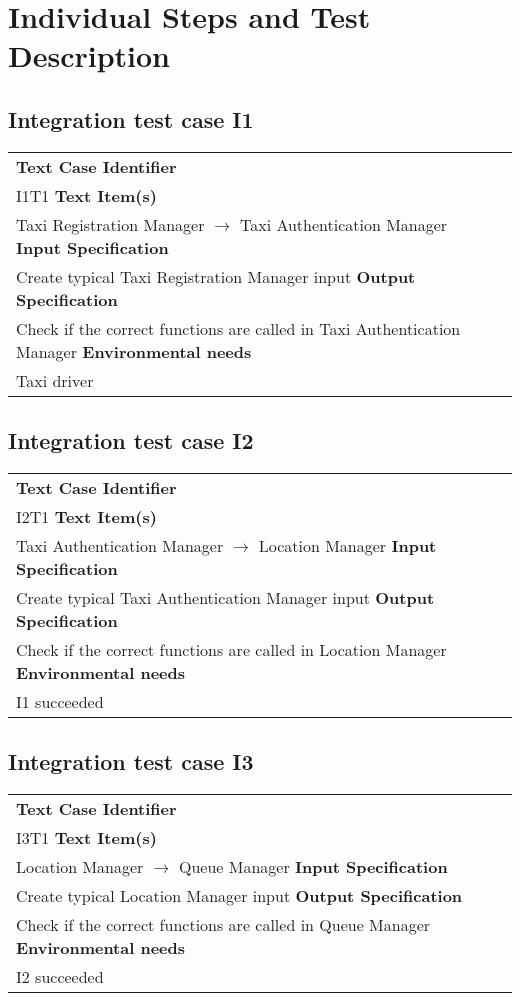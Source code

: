 \section{Individual Steps and Test Description}
\subsection{Integration test case I1}
	\begin{tabular} {l p{7cm}}
		\hline \textbf{Text Case Identifier} & \\ I1T1
		\hline \textbf{Text Item(s)} & \\ Taxi Registration Manager $\rightarrow$ Taxi Authentication Manager  
		\hline \textbf{Input Specification} & \\ Create typical Taxi Registration Manager input 
		\hline \textbf{Output Specification} & \\ Check if the correct functions are called in Taxi Authentication Manager 
		\hline \textbf{Environmental needs} & \\ Taxi driver
		\hline 
	\end{tabular}
\subsection{Integration test case I2}
	\begin{tabular} {l p{9cm}}
		\hline \textbf{Text Case Identifier} & \\ I2T1
		\hline \textbf{Text Item(s)} & \\ Taxi Authentication Manager $\rightarrow$ Location Manager
		\hline \textbf{Input Specification} & \\ Create typical Taxi Authentication Manager input
		\hline \textbf{Output Specification} & \\ Check if the correct functions are called in Location Manager
		\hline \textbf{Environmental needs} & \\ I1 succeeded
		\hline 
	\end{tabular}
\subsection{Integration test case I3}
	\begin{tabular} {l p{9cm}}
		\hline \textbf{Text Case Identifier} & \\ I3T1
		\hline \textbf{Text Item(s)} & \\ Location Manager $\rightarrow$ Queue Manager
		\hline \textbf{Input Specification} & \\ Create typical Location Manager input
		\hline \textbf{Output Specification} & \\ Check if the correct functions are called in Queue Manager
		\hline \textbf{Environmental needs} & \\ I2 succeeded
		\hline 
	\end{tabular}
